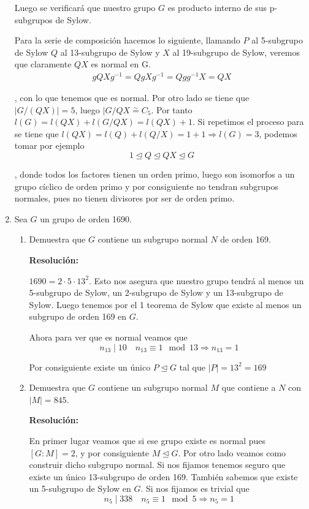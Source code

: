 \documentclass{article}
\begin{document}
\begin{enumerate}
Luego se verificará que nuestro grupo $G$ es producto interno de sus p-subgrupos de Sylow.

Para la serie de composición hacemos lo siguiente, llamando $P$ al 5-subgrupo de Sylow $Q$ al 13-subgrupo de Sylow y $X$ al 19-subgrupo de Sylow, veremos que claramente $QX$ es normal en G.
\begin{gather*}
gQXg^{-1}=QgXg^{-1}=Qgg^{-1}X=QX
\end{gather*}

, con lo que tenemos que es normal. Por otro lado se tiene que $|G/(QX)|=5$, luego $|G/QX\overset{\sim}{=} C_5$. Por tanto $l(G)=l(QX)+l(G/QX)=l(QX)+1$. Si repetimos el proceso para se tiene que $l(QX)=l(Q)+l(Q/X)=1+1\Rightarrow l(G)=3$, podemos tomar por ejemplo
\begin{equation*}
1\unlhd Q\unlhd QX\unlhd G
\end{equation*}

, donde todos los factores tienen un orden primo, luego son isomorfos a un grupo cíclico de orden primo y por consiguiente no tendran subgrupos normales, pues no tienen divisores por ser de orden primo.

\item Sea $G$ un grupo de orden 1690.
	\begin{enumerate}
	\item Demuestra que $G$ contiene un subgrupo normal $N$ de orden 169.
	
	\textbf{Resolución:}

$1690=2\cdot 5\cdot 13^2$. Esto nos asegura que nuestro grupo tendrá al menos un 5-subgrupo de Sylow, un 2-subgrupo de Sylow y un 13-subgrupo de Sylow. Luego tenemos por el 1 teorema de Sylow que existe al menos un subgrupo de orden 169 en $G$. 

Ahora para ver que es normal veamos que
\begin{equation*}
n_{13}\mid 10 \quad n_{13}\equiv 1\mod 13\Rightarrow n_{13}=1
\end{equation*}

Por consiguiente existe un único $P\unlhd G$ tal que $|P|=13^2=169$
	
	\item Demuestra que $G$ contiene un subgrupo normal $M$ que contiene a $N$ con $|M|=845$.
	
	\textbf{Resolución:}
	
	En primer lugar veamos que si ese grupo existe es normal pues $\left[G:M\right]=2$, y por consiguiente $M\unlhd G$. Por otro lado veamos como construir dicho subgrupo normal. Si nos fijamos tenemos seguro que existe un único 13-subgrupo de orden 169. También sabemos que existe un 5-subgrupo de Sylow en $G$. Si nos fijamos es trivial que
\begin{equation*}
n_5\mid 338\quad n_5\equiv 1 \mod 5\Rightarrow n_5=1
\end{equation*}


\end{enumerate}
\end{enumerate}
\end{document}
